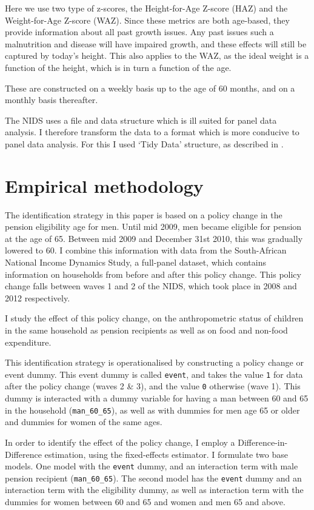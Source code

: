 \documentclass[a4paper,british]{article}\usepackage[]{graphicx}\usepackage[]{color}
\newcommand{\code}[1]{\texttt{#1}}
\begin{document}
Here we use two type of z-scores, the Height-for-Age Z-score (HAZ)
and the Weight-for-Age Z-score (WAZ). Since these metrics are both
age-based, they provide information about all past growth issues.
Any past issues such a malnutrition and disease will have impaired
growth, and these effects will still be captured by today's height.
This also applies to the WAZ, as the ideal weight is a function of
the height, which is in turn a function of the age.

These are constructed on a weekly basis up to the age of 60 months,
and on a monthly basis thereafter.

The NIDS uses a file and data structure which is ill suited for panel
data analysis. I therefore transform the data to a format which is
more conducive to panel data analysis. For this I used `Tidy Data'
structure, as described in \citet{wickham2014tidy}.

\section{Empirical methodology}

\label{sec:methods} The identification strategy in this paper is
based on a policy change in the pension eligibility age for men. Until
mid 2009, men became eligible for pension at the age of 65. Between
mid 2009 and December 31st 2010, this was gradually lowered to 60.
I combine this information with data from the South-African National
Income Dynamics Study, a full-panel dataset, which contains information
on households from before and after this policy change. This policy
change falls between waves 1 and 2 of the NIDS, which took place in
2008 and 2012 respectively.

I study the effect of this policy change, on the anthropometric status
of children in the same household as pension recipients as well as
on food and non-food expenditure. 

This identification strategy is operationalised by constructing a
policy change or event dummy. This event dummy is called \code{event},
and takes the value \code{1} for data after the policy change (waves
2 \& 3), and the value \code{0} otherwise (wave 1). This dummy is
interacted with a dummy variable for having a man between 60 and 65
in the household (\code{man\_60\_65}), as well as with dummies for
men age 65 or older and dummies for women of the same ages.

In order to identify the effect of the policy change, I employ a Difference-in-Difference
estimation, using the fixed-effects estimator. I formulate two base
models. One model with the \code{event} dummy, and an interaction
term with male pension recipient (\code{man\_60\_65}). The second
model has the \code{event} dummy and an interaction term with the
eligibility dummy, as well as interaction term with the dummies for
women between 60 and 65 and women and men 65 and above.
\end{document}
